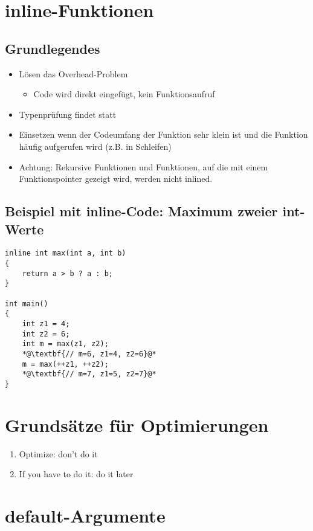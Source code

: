 \section{inline-Funktionen}

\subsection{Grundlegendes}
\begin{itemize}
	\item Lösen das Overhead-Problem
	\begin{itemize}
		\item Code wird direkt eingefügt, kein Funktionsaufruf
	\end{itemize}
	\item Typenprüfung findet statt
	\item Einsetzen wenn der Codeumfang der Funktion sehr klein ist und die Funktion häufig aufgerufen wird (z.B. in Schleifen)
	\item Achtung: Rekursive Funktionen und Funktionen, auf die mit einem Funktionspointer gezeigt wird, werden nicht inlined.
\end{itemize}

\subsection{Beispiel mit inline-Code: Maximum zweier int-Werte}
\noindent
\begin{minipage}{0.4\linewidth}
\begin{lstlisting}
inline int max(int a, int b)
{
	return a > b ? a : b;
}

int main()
{
	int z1 = 4;
	int z2 = 6;
	int m = max(z1, z2);
	*@\textbf{// m=6, z1=4, z2=6}@*
	m = max(++z1, ++z2);
	*@\textbf{// m=7, z1=5, z2=7}@*
}
\end{lstlisting}
\end{minipage}

\section{Grundsätze für Optimierungen}
\begin{enumerate}
	\item Optimize: don't do it
	\item If you have to do it: do it later
\end{enumerate} 

\section{default-Argumente}

